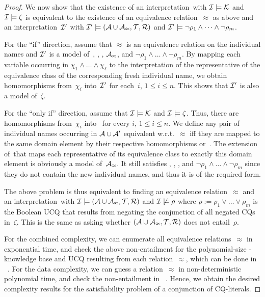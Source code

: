 \begin{proof}
    We now show that the existence of an interpretation~\Imc with
    $\mathcal{I}\models\mathcal{K}$ and $\mathcal{I}\models\zeta$ is equivalent to the existence of
    an equivalence relation~$\approx$ as above and an interpretation~$\mathcal{I}'$
    with $\mathcal{I}'\models(\mathcal{A}\cup\mathcal{A}_\approx,\mathcal{T},\mathcal{R})$ and
    $\mathcal{I}'\models\lnot\rho_1\land\dots\land\lnot\rho_m$.

    For the \enquote{if} direction, assume that $\approx$ is an equivalence
    relation on the individual names and $\mathcal{I}'$ is a model of~\Amc, \Tmc, \Rmc,
    $\mathcal{A}_\approx$, and $\lnot\rho_1\land\dots\land\lnot\rho_m$.  By mapping
    each variable occurring in $\chi_1\land\dots\land\chi_\ell$ to the
    interpretation of the representative of the equivalence class of the
    corresponding fresh individual name, we obtain homomorphisms from~$\chi_i$
    into~$\mathcal{I}'$ for each~$i$, $1\le i\le n$.  This shows that $\mathcal{I}'$ is also a
    model of~$\zeta$.

    For the \enquote{only if} direction, assume that $\mathcal{I}\models\mathcal{K}$ and
    $\mathcal{I}\models\zeta$.  Thus, there are homomorphisms from~$\chi_i$ into~\Imc
    for every $i$, $1\le i\le n$.  We define any pair of individual names
    occurring in $\mathcal{A}\cup\mathcal{A}'$ equivalent w.r.t.~$\approx$ iff they are mapped
    to the same domain element by their respective homomorphisms or~\Imc.  The
    extension of~\Imc that maps each representative of its equivalence class to
    exactly this domain element is obviously a model of~$\mathcal{A}_\approx$.  It
    still satisfies \Amc, \Tmc, \Rmc, and
    $\lnot\rho_1\land\dots\land\lnot\rho_m$ since they do not contain the new
    individual names, and thus it is of the required form.

    The above problem is thus equivalent to finding an equivalence
    relation~$\approx$ and an interpretation~\Imc with
    $\mathcal{I}\models(\mathcal{A}\cup\mathcal{A}_\approx,\mathcal{T},\mathcal{R})$ and
    $\mathcal{I}\not\models\rho$ where $\rho:=\rho_1\lor\dots\lor\rho_m$ is the Boolean
    UCQ that results from negating the conjunction of all negated CQs
    in~$\zeta$.  This is the same as asking whether
    $(\mathcal{A}\cup\mathcal{A}_\approx,\mathcal{T},\mathcal{R})$ does not entail~$\rho$.

    For the combined complexity, we can enumerate all equivalence
    relations~$\approx$ in exponential time, and check the above non-entailment
    for the polynomial-size \SHQ-knowledge base and UCQ resulting from each
    relation~$\approx$, which can be done in \ExpTime~\cite{Lut-IJCAR08}.
    For the data complexity, we can guess a relation~$\approx$ in
    non-deterministic polynomial time, and check the non-entailment in
    \NP~\cite{OrCE-AAAI06}.
    Hence, we obtain the desired complexity results for the satisfiability
    problem of a conjunction of CQ-literals.
\end{proof}

